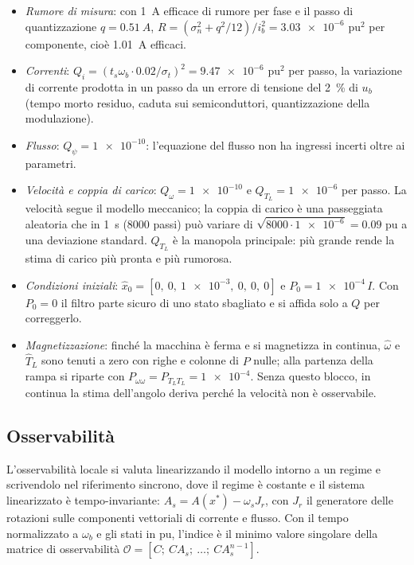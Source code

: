 \documentclass[10pt,a4paper]{scrartcl}
\newcommand{\ts}{t_s}
\newcommand{\wb}{\omega_b}
\newcommand{\xh}{\hat{x}}
\begin{document}
\begin{onehalfspace}
\begin{itemize}
\item \emph{Rumore di misura}: con \SI{1}{A} efficace di rumore per fase e il passo di quantizzazione $q = \SI{0.51}{A}$, $R = (\sigma_n^2 + q^2/12)/i_b^2 = \num{3.03e-6}$ pu$^2$ per componente, cioè \SI{1.01}{A} efficaci.
\item \emph{Correnti}: $Q_i = (\ts\wb\cdot\num{0.02}/\sigma_t)^2 = \num{9.47e-6}$ pu$^2$ per passo, la variazione di corrente prodotta in un passo da un errore di tensione del \SI{2}{\percent} di $u_b$ (tempo morto residuo, caduta sui semiconduttori, quantizzazione della modulazione).
\item \emph{Flusso}: $Q_\psi = \num{1e-10}$: l'equazione del flusso non ha ingressi incerti oltre ai parametri.
\item \emph{Velocità e coppia di carico}: $Q_\omega = \num{1e-10}$ e $Q_{T_L} = \num{1e-6}$ per passo. La velocità segue il modello meccanico; la coppia di carico è una passeggiata aleatoria che in \SI{1}{s} (\num{8000} passi) può variare di $\sqrt{\num{8000}\cdot\num{1e-6}} = \num{0.09}$ pu a una deviazione standard. $Q_{T_L}$ è la manopola principale: più grande rende la stima di carico più pronta e più rumorosa.
\item \emph{Condizioni iniziali}: $\xh_0 = [0,\ 0,\ \num{1e-3},\ 0,\ 0,\ 0]$ e $P_0 = \num{1e-4}\,I$. Con $P_0 = 0$ il filtro parte sicuro di uno stato sbagliato e si affida solo a $Q$ per correggerlo.
\item \emph{Magnetizzazione}: finché la macchina è ferma e si magnetizza in continua, $\hat\omega$ e $\hat T_L$ sono tenuti a zero con righe e colonne di $P$ nulle; alla partenza della rampa si riparte con $P_{\omega\omega} = P_{T_LT_L} = \num{1e-4}$. Senza questo blocco, in continua la stima dell'angolo deriva perché la velocità non è osservabile.
\end{itemize}

\subsection{Osservabilità}
\label{sec:osservabilita}

L'osservabilità locale si valuta linearizzando il modello intorno a un regime e scrivendolo nel riferimento sincrono, dove il regime è costante e il sistema linearizzato è tempo-invariante: $A_s = A(x^*) - \omega_s J_r$, con $J_r$ il generatore delle rotazioni sulle componenti vettoriali di corrente e flusso. Con il tempo normalizzato a $\wb$ e gli stati in pu, l'indice è il minimo valore singolare della matrice di osservabilità $\mathcal{O} = [C;\ CA_s;\ \dots;\ CA_s^{n-1}]$.


\end{onehalfspace}
\end{document}
